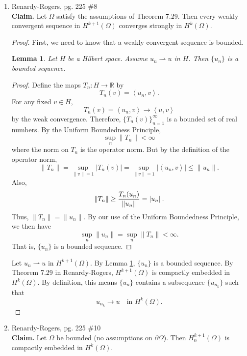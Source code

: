 \documentclass[a4paper]{article}
\newtheorem{lemma}{Lemma}[section]
\newenvironment{claim}{\textbf{Claim.}}{}
\newcommand{\R}{\mathbb{R}}
\newcommand{\la}{\left \langle}
\newcommand{\ra}{\right \rangle}
\begin{document}
\begin{enumerate}
\begin{proof}
      Therefore $uv \in H^1(\R)$.
    \end{proof}

  \item Renardy-Rogers, pg. 225 \#8 \\
    \begin{claim}
      Let $\Omega$ satisfy the assumptions of Theorem 7.29. Then every weakly convergent sequence in $H^{k+1}(\Omega)$ converges strongly in
      $H^k(\Omega)$.
    \end{claim}

    \begin{proof}
      First, we need to know that a weakly convergent sequence is bounded.
      \begin{lemma} \label{weak_bdd}
        Let $H$ be a Hilbert space. Assume $u_n \rightharpoonup u$ in $H$. Then $\{u_n\}$ is a bounded sequence.
      \end{lemma}
      \begin{proof}
        Define the maps $T_n:H \to \R$ by
        \[ T_n(v) = \la u_n, v \ra .\]
        For any fixed $v \in H$,
        \[ T_n(v) = \la u_n, v \ra \to \la u, v \ra \]
        by the weak convergence. Therefore, $\{ T_n(v) \}_{n=1}^\infty$ is a bounded set of real numbers.
        By the Uniform Boundedness Principle,
        \[ \sup_n \|T_n\| < \infty \]
        where the norm on $T_n$ is the operator norm.
        But by the definition of the operator norm,
        \[ \|T_n\| = \sup_{\|v\|=1} |T_n(v)| = \sup_{\|v\|=1} |\la u_n, v \ra| \leq \|u_n\| .\]
        Also,
        \[ \|T_n\| \geq \frac{T_n(u_n)}{\|u_n\|} = \\|u_n\| .\]
        Thus, $\|T_n\| = \|u_n\|$. By our use of the Uniform Boundedness Principle, we then have
        \[ \sup_n \|u_n\| = \sup_n\|T_n\| < \infty .\]
        That is, $\{u_n\}$ is a bounded sequence.
      \end{proof}

      Let $u_n \rightharpoonup u$ in $H^{k+1}(\Omega)$. By Lemma \ref{weak_bdd}, $\{u_n\}$ is a bounded sequence.
      By Theorem 7.29 in Renardy-Rogers, $H^{k+1}(\Omega)$ is compactly embedded in $H^k(\Omega)$. By definition, this means $\{u_n\}$ contains a
      subsequence $\{u_{n_k}\}$ such that
      \[ u_{n_k} \to u \quad \text{in } H^{k}(\Omega). \]
    \end{proof}

  \item Renardy-Rogers, pg. 225 \#10 \\
    \begin{claim}
      Let $\Omega$ be bounded (no assumptions on $\partial \Omega$). Then $H_0^{k+1}(\Omega)$ is compactly embedded in $H^k(\Omega)$.
    \end{claim}


\end{enumerate}
\end{document}

